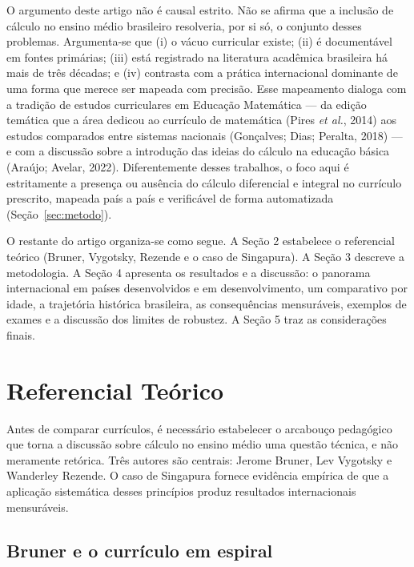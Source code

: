 \documentclass[12pt,a4paper,oneside]{article}
\begin{document}
O argumento deste artigo não é causal estrito. Não se afirma que a
inclusão de cálculo no ensino médio brasileiro resolveria, por si só, o
conjunto desses problemas. Argumenta-se que (i) o vácuo curricular
existe; (ii) é documentável em fontes primárias; (iii) está registrado na
literatura acadêmica brasileira há mais de três décadas; e (iv) contrasta
com a prática internacional dominante de uma forma que merece ser mapeada
com precisão. Esse mapeamento dialoga com a tradição de estudos
curriculares em Educação Matemática --- da edição temática que a área
dedicou ao currículo de matemática (Pires \emph{et al.}, 2014) aos estudos
comparados entre sistemas nacionais (Gonçalves; Dias; Peralta, 2018) --- e
com a discussão sobre a introdução das ideias do cálculo na educação
básica (Araújo; Avelar, 2022). Diferentemente desses trabalhos, o foco
aqui é estritamente a presença ou ausência do cálculo diferencial e
integral no currículo prescrito, mapeada país a país e verificável de
forma automatizada (Seção~\ref{sec:metodo}).

O restante do artigo organiza-se como segue. A Seção 2 estabelece o
referencial teórico (Bruner, Vygotsky, Rezende e o caso de Singapura). A
Seção 3 descreve a metodologia. A Seção 4 apresenta os resultados e a
discussão: o panorama internacional em países desenvolvidos e em
desenvolvimento, um comparativo por idade, a trajetória histórica
brasileira, as consequências mensuráveis, exemplos de exames e a
discussão dos limites de robustez. A Seção 5 traz as considerações
finais.

\section{Referencial Teórico}

Antes de comparar currículos, é necessário estabelecer o arcabouço
pedagógico que torna a discussão sobre cálculo no ensino médio uma
questão técnica, e não meramente retórica. Três autores são centrais:
Jerome Bruner, Lev Vygotsky e Wanderley Rezende. O caso de Singapura
fornece evidência empírica de que a aplicação sistemática desses
princípios produz resultados internacionais mensuráveis.

\subsection{Bruner e o currículo em espiral}
\end{document}
